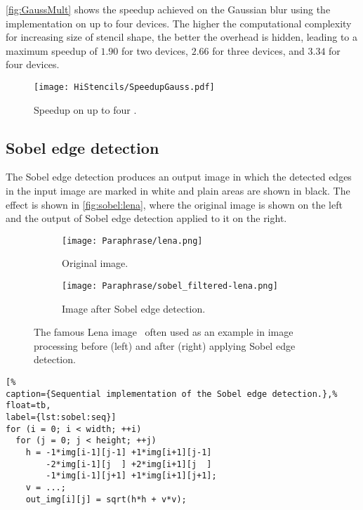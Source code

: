 \autoref{fig:GaussMult} shows the speedup achieved on the Gaussian blur using the  implementation on up to four devices.
The higher the computational complexity for increasing size of stencil shape, the better the overhead is hidden, leading to a maximum speedup of $1.90$ for two devices, $2.66$ for three devices, and $3.34$ for four devices.
\begin{figure}
	\centering
	\texttt{[image: HiStencils/SpeedupGauss.pdf]}
	\caption{Speedup on up to four \GPUs.}
	\label{fig:GaussMult}
\end{figure} 










\subsection{Sobel edge detection}
\label{sec:sobel}
The Sobel edge detection produces an output image in which the detected edges in the input image are marked in white and plain areas are shown in black.
The effect is shown in \autoref{fig:sobel:lena}, where the original image is shown on the left and the output of Sobel edge detection applied to it on the right.

\begin{figure}[tb]
  \centering
  \begin{subfigure}[t]{.45\textwidth}
    \texttt{[image: Paraphrase/lena.png]}
    \caption{Original image.}
    \label{fig:lena:orig}
  \end{subfigure}
  \hfill
  \begin{subfigure}[t]{.45\textwidth}
    \texttt{[image: Paraphrase/sobel\_filtered-lena.png]}
    \caption{Image after Sobel edge detection.}
    \label{fig:lena:sobel}
  \end{subfigure}
  \caption{The famous Lena image~\cite{Lena} often used as an example in image processing before (left) and after (right) applying Sobel edge detection.}
  \label{fig:sobel:lena}
\end{figure}

\begin{lstlisting}[%
caption={Sequential implementation of the Sobel edge detection.},%
float=tb,
label={lst:sobel:seq}]
for (i = 0; i < width; ++i)
  for (j = 0; j < height; ++j)
    h = -1*img[i-1][j-1] +1*img[i+1][j-1]
        -2*img[i-1][j  ] +2*img[i+1][j  ]
        -1*img[i-1][j+1] +1*img[i+1][j+1];
    v = ...;
    out_img[i][j] = sqrt(h*h + v*v);
\end{lstlisting}
\bigskip

